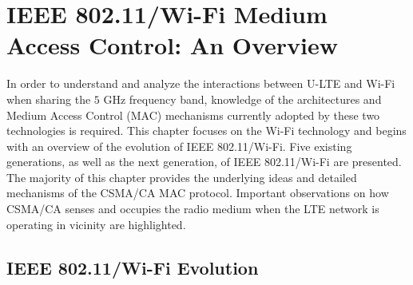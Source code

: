 %
%
%
\chapter{IEEE 802.11/Wi-Fi Medium Access Control: An Overview}
\label{overview-wifi}


In order to understand and analyze the interactions between \mbox{U-LTE} and \mbox{Wi-Fi} when sharing the $5$ GHz frequency band, knowledge of the architectures and Medium Access Control (MAC) mechanisms currently adopted by these two technologies is required. This chapter focuses on the \mbox{Wi-Fi} technology and begins with an overview of the evolution of IEEE 802.11/\mbox{Wi-Fi}. Five existing generations, as well as the next generation, of IEEE 802.11/\mbox{Wi-Fi} are presented. The majority of this chapter provides the underlying ideas and detailed mechanisms of the CSMA/CA MAC protocol. Important observations on how CSMA/CA senses and occupies the radio medium when the LTE network is operating in vicinity are highlighted.

\section{IEEE 802.11/Wi-Fi Evolution}
\label{wifi-lbt}

